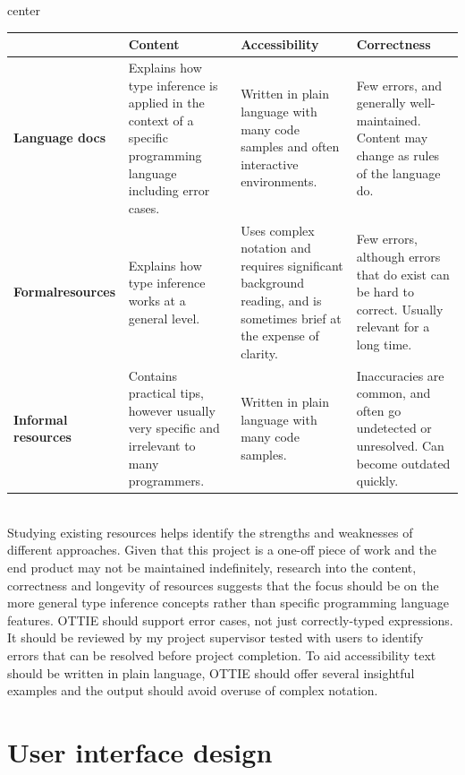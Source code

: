 \documentclass[a4paper,fleqn,oneside,12pt]{report}
\begin{document}
\begin{adjustbox}{center}\begin{tabularx}{1.2\textwidth}{ |p{2cm}|X|X|X| }
  \hline
   & \textbf{Content} & \textbf{Accessibility} & \textbf{Correctness} \\
  \hline
  \textbf{Language docs} & Explains how type inference is applied in the context of a specific programming language including error cases. & Written in plain language with many code samples and often interactive environments. & Few errors, and generally well-maintained. Content may change as rules of the language do. \\
  \hline
  \textbf{Formal\newline resources} & Explains how type inference works at a general level. & Uses complex notation and requires significant background reading, and is sometimes brief at the expense of clarity. & Few errors, although errors that do exist can be hard to correct. Usually relevant for a long time. \\
  \hline
  \textbf{Informal resources} & Contains practical tips, however usually very specific and irrelevant to many programmers. & Written in plain language with many code samples. & Inaccuracies are common, and often go undetected or unresolved. Can become outdated quickly. \\
  \hline
\end{tabularx}\end{adjustbox}\\

Studying existing resources helps identify the strengths and weaknesses of different approaches. Given that this project is a one-off piece of work and the end product may not be maintained indefinitely, research into the content, correctness and longevity of resources suggests that the focus should be on the more general type inference concepts rather than specific programming language features. OTTIE should support error cases, not just correctly-typed expressions. It should be reviewed by my project supervisor tested with users to identify errors that can be resolved before project completion. To aid accessibility text should be written in plain language, OTTIE should offer several insightful examples and the output should avoid overuse of complex notation.

\section{User interface design}
\end{document}
